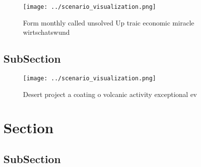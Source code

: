 \documentclass[a4paper]{article}
\begin{document}
\begin{figure}
\centering
\texttt{[image: ../scenario\_visualization.png]}
\caption{Form monthly called unsolved Up traic economic miracle wirtschatswund
}
\end{figure}
 
\subsection{SubSection}

\begin{figure}
\centering
\texttt{[image: ../scenario\_visualization.png]}
\caption{Desert project a coating o volcanic activity exceptional ev
}
\end{figure}
 
\section{Section}

\subsection{SubSection}
\end{document}
